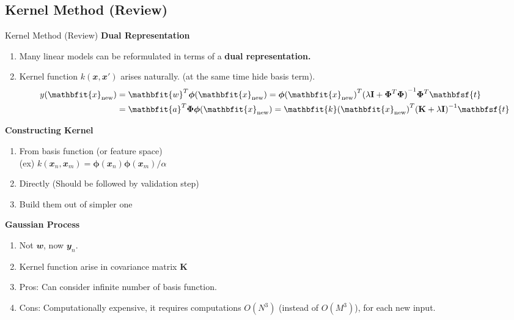 \documentclass{bredelebeamer}
\begin{document}
\subsection{Kernel Method (Review)}
\begin{frame}{Kernel Method (Review)}
\textbf{Dual Representation} \\
  \begin{enumerate}
    \item Many linear models can be reformulated in terms of a \textbf{dual
          representation.}
    \item Kernel function $k(\mathbfit{x},\mathbfit{x}')$ arises naturally. (at
          the same time hide basis term).
    \begin{equation}
      \begin{split}
        y(\mathbfit{x}_{\textrm{new}})
        &= \mathbfit{w}^T \boldsymbol{\phi}(\mathbfit{x}_{\textrm{new}})
        = {\boldsymbol{\phi}(\mathbfit{x}_{\textrm{new}})}^T {(\lambda\mathbf{I} + \boldsymbol{\Phi}^T \boldsymbol{\Phi})}^{-1} \boldsymbol{\Phi}^T \mathbfsf{t} \\
        &= \mathbfit{a}^T \boldsymbol{\Phi} \boldsymbol{\phi}(\mathbfit{x}_{\textrm{new}})
        = {\mathbfit{k}(\mathbfit{x}_{\textrm{new}})}^T {(\mathbf{K} + \lambda \mathbf{I})}^{-1} \mathbfsf{t}
      \end{split}
    \end{equation}

  \end{enumerate}

  \textbf{Constructing Kernel} \\
  \begin{enumerate}
    \item From basis function (or feature space) \\
          (ex) $k(\mathbfit{x}_n,\mathbfit{x}_m) = \boldsymbol{\phi}(\mathbfit{x}_n)
          \boldsymbol{\phi}(\mathbfit{x}_m) / \alpha$
    \item Directly (Should be followed by validation step)
    \item Build them out of simpler one
  \end{enumerate}

  \textbf{Gaussian Process} \\
  \begin{enumerate}
    \item Not $\mathbfit{w}$, now $\mathbfit{y}_n$.
    \item Kernel function arise in covariance matrix $\mathbf{K}$
    \item Pros: Can consider infinite number of basis function.
    \item Cons: Computationally expensive, it requires computations $O(N^3)$ (instead
          of $O(M^3)$), for each new input.
  \end{enumerate}
\end{frame}
\end{document}

